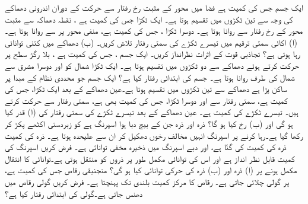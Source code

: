 ایک جسم جس کی  کمیت  ہے فضا میں  محور کے مثبت رخ  رفتار سے حرکت   کے دوران اندرونی دھماکے کی وجہ سے تین ٹکڑوں میں تقسیم ہوتا  ہے۔ ایک ٹکڑا جس کی کمیت  ہے  ، نقطہ دھماکہ سے مثبت     محور کے رخ    رفتار سے روانا ہوتا ہے۔ دوسرا ٹکڑا ، جس کی کمیت  ہے، منفی  محور پر  سے روانا  ہوتا  ہے۔ (ا) اکائی سمتی ترقیم میں  تیسرے ٹکڑے کی سمتی رفتار تلاش کریں۔ (ب)  دھماکے میں کتنی توانائی رہا ہوتی ہے؟ تجاذبی قوت کے  اثرات نظرانداز کریں۔
ایک  جسم ، جس کی کمیت  ہے ، بلا رگڑ سطح پر  حرکت کرتے ہوئے دھماکے سے دو  ٹکڑوں میں تقسیم ہوتا ہے۔ ایک ٹکڑا   شمال  کو اور دوسرا  مشرق سے  شمال  کی طرف روانا ہوتا ہے۔ جسم کی ابتدائی رفتار کیا ہے؟
ایک جسم جو  محددی نظام کے مبدا پر ساکن پڑا ہے دھماکے سے تین ٹکڑوں میں تقسیم ہوتا ہے۔عین  دھماکے  کے بعد ایک ٹکڑا، جس کی کمیت  ہے،  سمتی  رفتار سے  اور دوسرا ٹکڑا، جس کی کمیت   بھی  ہے،   سمتی رفتار سے  حرکت کرتے ہیں۔ تیسرے ٹکڑے کی کمیت  ہے۔ عین دھماکے کے بعد تیسرے ٹکڑے کی سمتی رفتار کی (ا) قدر  کیا ہو گی اور (ب) رخ کیا ہو گا؟
ذرہ  اور ذرہ    جن کے بیچ دبا ہوا اسپرنگ ہے کو زبردستی اکٹھے   پکڑ کر رکھا گیا ہے۔رہا کرنے پر  اسپرنگ انہیں مخالف رخوں  دھکیل کر ان سے علیحدہ ہوتا ہے۔ ذرہ  کی کمیت ذرہ  کی کمیت کی  گنّا ہے، اور دبے   اسپرنگ میں ذخیرہ مخفی توانائی  ہے۔ فرض کریں اسپرنگ کی کمیت قابل نظر انداز ہے اور اس کی توانائی مکمل طور پر ذروں کو منتقل ہوتی ہے۔توانائی کا  انتقال  مکمل ہونے پر (ا) ذرہ  اور (ب) ذرہ  کی حرکی توانائی کیا ہو گی؟
منجنیقی رقاص جس کی کمیت  ہے، پر  گولی  چلائی جاتی ہے۔ رقاص کا مرکز کمیت   بلندی  تک پہنچتا ہے۔ فرض کریں گولی رقاص میں دھنس جاتی ہے۔گولی کی ابتدائی رفتار کیا ہے؟
